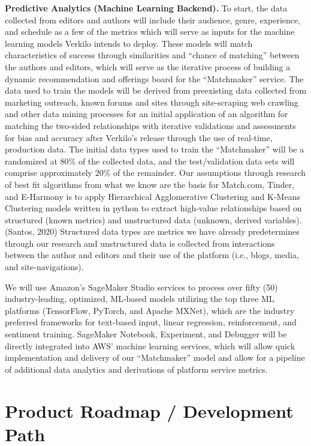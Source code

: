 \documentclass[10pt,openany]{book}
\begin{document}
\textbf{Predictive Analytics (Machine Learning Backend).} To start, the
data collected from editors and authors will include their audience,
genre, experience, and schedule as a few of the metrics which will serve
as inputs for the machine learning models Verkilo intends to deploy.
These models will match characteristics of success through similarities
and ``chance of matching'' between the authors and editors, which will
serve as the iterative process of building a dynamic recommendation and
offerings board for the ``Matchmaker'' service. The data used to train
the models will be derived from preexisting data collected from
marketing outreach, known forums and sites through site-scraping web
crawling and other data mining processes for an initial application of
an algorithm for matching the two-sided relationships with iterative
validations and assessments for bias and accuracy after Verkilo's
release through the use of real-time, production data. The initial data
types used to train the ``Matchmaker'' will be a randomized at 80\% of
the collected data, and the test/validation data sets will comprise
approximately 20\% of the remainder. Our assumptions through research of
best fit algorithms from what we know are the basis for Match.com,
Tinder, and E-Harmony is to apply Hierarchical Agglomerative Clustering
and K-Means Clustering models written in python to extract high-value
relationships based on structured (known metrics) and unstructured data
(unknown, derived variables). (Santos, 2020) Structured data types are
metrics we have already predetermines through our research and
unstructured data is collected from interactions between the author and
editors and their use of the platform (i.e., blogs, media, and
site-navigations).

We will use Amazon's SageMaker Studio services to process over fifty
(50) industry-leading, optimized, ML-based models utilizing the top
three ML platforms (TensorFlow, PyTorch, and Apache MXNet), which are
the industry preferred frameworks for text-based input, linear
regression, reinforcement, and sentiment training. SageMaker Notebook,
Experiment, and Debugger will be directly integrated into AWS' machine
learning services, which will allow quick implementation and delivery of
our ``Matchmaker'' model and allow for a pipeline of additional data
analytics and derivations of platform service metrics.

\hypertarget{product-roadmap-development-path}{%
\section{Product Roadmap / Development
Path}\label{product-roadmap-development-path}}
\end{document}
